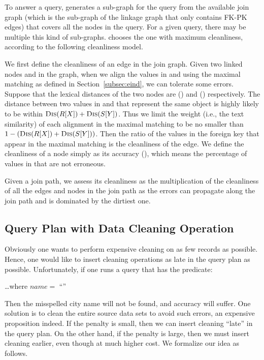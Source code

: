 To answer a query, \dcv generates a sub-graph for the query from the available join graph (which is the sub-graph of the linkage graph that only contains FK-PK edges) that covers all the nodes in the query. For a given query, there may be multiple this kind of sub-graphs. \dcv chooses the one with maximum cleanliness, according to the following cleanliness model.



We first define the cleanliness of an edge in the join graph. Given two linked nodes \RX and \SY in the graph, when we align the values in \RX and \SY using the maximal matching as defined in Section~\ref{subsec:eind}, we can tolerate some errors. Suppose that the lexical distances of the two nodes are \Dis(\RX) and \Dis(\SY) respectively. The distance between two values in \RX and \SY that represent the same object is highly likely to be within $\textsc{Dis}(R[X]) + \textsc{Dis}(S[Y])$. Thus we limit the weight (i.e., the text similarity) of each alignment in the maximal matching to be no smaller than $1-(\textsc{Dis}(R[X])+\textsc{Dis}(S[Y]))$. Then the ratio of the values in the foreign key that appear in the maximal matching is the cleanliness of the edge. We define the cleanliness of a node \RX simply as its accuracy \Acc(\RX), which means the percentage of values in \RX that are not erroneous.

Given a join path, we assess its cleanliness as the multiplication of the cleanliness of all the edges and nodes in the join path as the errors can propagate along the join path and is dominated by the dirtiest one.



\subsection{Query Plan with Data Cleaning Operation}\label{subsec:gain}

Obviously one wants to perform expensive cleaning on as few records as possible. Hence, one would like to insert cleaning operations as late in the query plan as possible. Unfortunately, if one runs a query that has the predicate:

\vspace{.5em}
\dots \textsf{where} $name = $ ``''
\vspace{.5em}

\noindent Then the misspelled city name will not be found, and accuracy will suffer. One solution is to clean the entire source data sets to avoid such errors, an expensive proposition indeed. If the penalty is small, then we can insert cleaning ``late'' in the query plan. On the other hand, if the penalty is large, then we must insert cleaning earlier, even though at much higher cost. We formalize our idea as follows.




